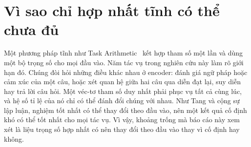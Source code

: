 \section{Vì sao chỉ hợp nhất tĩnh có thể chưa đủ}

Một phương pháp tĩnh như Task Arithmetic~\cite{ilharco2023task} kết hợp tham số một lần và dùng một bộ trọng số cho mọi đầu vào. Năm tác vụ trong nghiên cứu này làm rõ giới hạn đó. Chúng đòi hỏi những điều khác nhau ở encoder: đánh giá ngữ pháp hoặc cảm xúc của một câu, hoặc xét quan hệ giữa hai câu qua diễn đạt lại, suy diễn hay trả lời câu hỏi. Một véc-tơ tham số duy nhất phải phục vụ tất cả cùng lúc, và hệ số tỉ lệ của nó chỉ có thể đánh đổi chúng với nhau. Như Tang và cộng sự~\cite{tang2024wemoe} lập luận, nghiệm tốt nhất có thể thay đổi theo đầu vào, nên một kết quả cố định khó có thể tốt nhất cho mọi tác vụ. Vì vậy, khoảng trống mà báo cáo này xem xét là liệu trọng số hợp nhất có nên thay đổi theo đầu vào thay vì cố định hay không.
